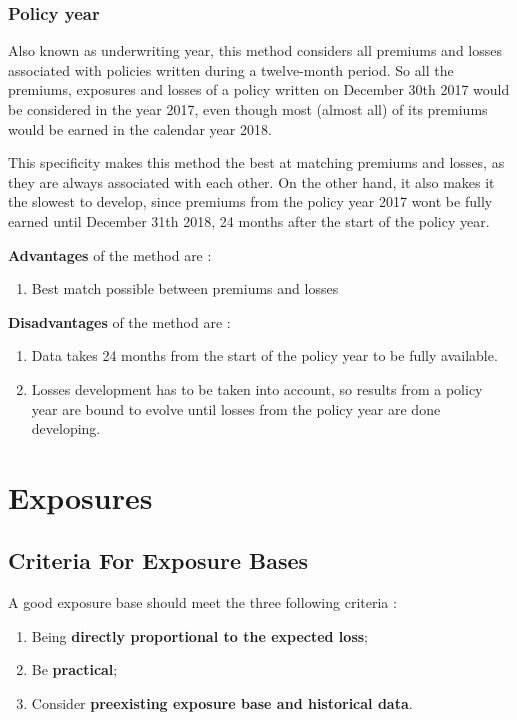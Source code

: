 \documentclass[11pt, english]{memoir}
\numberwithin{definition}{section}
\begin{document}
	\subsection{Policy year}
	Also known as underwriting year, this method considers all premiums and losses associated with policies written during a twelve-month period. So all the premiums, exposures and losses of a policy written on December 30th 2017 would be considered in the year 2017, even though most (almost all) of its premiums would be earned in the calendar year 2018. 
	
	This specificity makes this method the best at matching premiums and losses, as they are always associated with each other. On the other hand, it also makes it the slowest to develop, since premiums from the policy year 2017 wont be fully earned until December 31th 2018, 24 months after the start of the policy year. 

	\textbf{Advantages} of the method are :
	\begin{enumerate}
		\item Best match possible between premiums and losses
	\end{enumerate}
	
	\textbf{Disadvantages} of the method are : 
	\begin{enumerate}
		\item Data takes 24 months from the start of the policy year to be fully available. 
		\item Losses development has to be taken into account, so results from a policy year are bound to evolve until losses from the policy year are done developing. 
	\end{enumerate}











\chapter{Exposures}

\section{Criteria For Exposure Bases}
	A good exposure base should meet the three following criteria :
	\begin{enumerate}
	\item Being \textbf{directly proportional to the expected loss};
	\item Be \textbf{practical};
	\item Consider \textbf{preexisting exposure base and historical data}.
	\end{enumerate}
	
\end{document}
